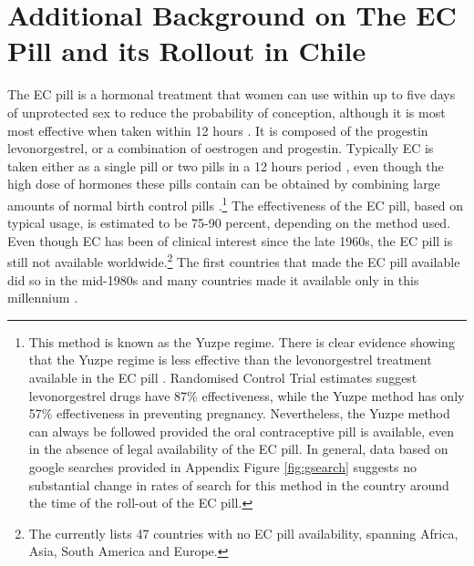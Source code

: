 \documentclass[12pt]{article}
\begin{document}
\section{Additional Background on The EC Pill and its Rollout in Chile}
\label{Ascn:background}
The EC pill is a hormonal treatment that women can use within up to five days of unprotected sex to reduce the probability of conception, although it is most most effective when taken within 12 hours \citep{vonHertzenetal2002}. It is composed of the progestin levonorgestrel, or a combination of oestrogen and progestin. Typically EC is taken either as a single pill or two pills in a 12 hours period \citep{vonHertzenetal2002}, even though the high dose of hormones these pills contain can be obtained by combining large amounts of normal birth control pills \citep{Ellersonetal1998}.\footnote{This method is known as the Yuzpe regime.  There is clear evidence showing that the Yuzpe regime is less effective than the levonorgestrel treatment available in the EC pill \citep{TFPMFR1998}.  Randomised Control Trial estimates suggest levonorgestrel drugs have 87\% effectiveness, while the Yuzpe method has only 57\% effectiveness in preventing pregnancy.  Nevertheless, the Yuzpe method can always be followed provided the oral contraceptive pill is available, even in the absence of legal availability of the EC pill.  In general, data based on google searches provided in Appendix Figure \ref{fig:gsearch} suggests no substantial change in rates of search for this method in the country around the time of the roll-out of the EC pill.}
  The effectiveness of the EC pill, based on typical usage, is estimated to be 75-90 percent, depending on the method used.  Even though EC has been of clinical interest since the late 1960s, the EC pill is still not available worldwide.\footnote{The \citet{ICEC2019} currently lists 47 countries with no EC pill availability, spanning Africa, Asia, South America and Europe.} The first countries that made the EC pill available did so in the mid-1980s and many countries made it available only in this millennium \citep{BentancorClarke2017}.
\end{document}

